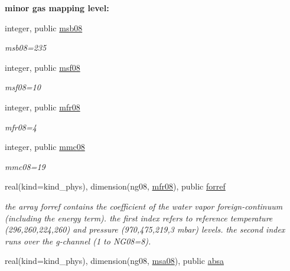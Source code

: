 \begin{Indent}\textbf{ minor gas mapping level\+:}\par
\begin{DoxyCompactItemize}
\item 
integer, public \hyperlink{group__module__radlw__kgbnn_ga3dd391fcce47d3aca3512bbfd946807b}{msb08}
\begin{DoxyCompactList}\small\item\em msb08=235 \end{DoxyCompactList}\item 
integer, public \hyperlink{group__module__radlw__kgbnn_ga7db22d5a0ece1b1f10cbf64ae1181a09}{msf08}
\begin{DoxyCompactList}\small\item\em msf08=10 \end{DoxyCompactList}\item 
integer, public \hyperlink{group__module__radlw__kgbnn_gabfaf0cad62f8ae42564f8127198d48f0}{mfr08}
\begin{DoxyCompactList}\small\item\em mfr08=4 \end{DoxyCompactList}\item 
integer, public \hyperlink{group__module__radlw__kgbnn_ga9e3bfc1880221c18fa07817eb62bcc47}{mmc08}
\begin{DoxyCompactList}\small\item\em mmc08=19 \end{DoxyCompactList}\item 
real(kind=kind\+\_\+phys), dimension(ng08, \hyperlink{group__module__radlw__kgbnn_gabfaf0cad62f8ae42564f8127198d48f0}{mfr08}), public \hyperlink{group__module__radlw__kgbnn_ga8427ec5170f6a61a008a8580be6fe5ec}{forref}
\begin{DoxyCompactList}\small\item\em the array forref contains the coefficient of the water vapor foreign-\/continuum (including the energy term). the first index refers to reference temperature (296,260,224,260) and pressure (970,475,219,3 mbar) levels. the second index runs over the g-\/channel (1 to N\+G08=8). \end{DoxyCompactList}\item 
real(kind=kind\+\_\+phys), dimension(ng08, \hyperlink{namespacemodule__radlw__kgb08_a74e4bd8f4b00d0ff6bae1a39d9bddd3b}{msa08}), public \hyperlink{group__module__radlw__kgbnn_gaba1018958264bbc6fbf7f190fea91fa5}{absa}

\end{DoxyCompactItemize}
\end{Indent}
